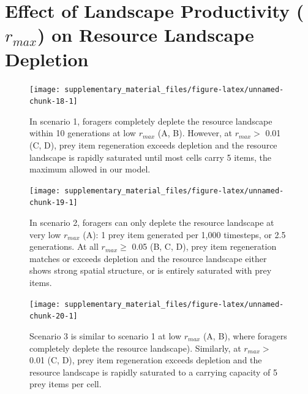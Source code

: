 \documentclass[]{article}
\begin{document}
\newpage

\hypertarget{effect-of-landscape-productivity-r_max-on-resource-landscape-depletion}{%
\section{\texorpdfstring{Effect of Landscape Productivity (\(r_{max}\)) on Resource Landscape Depletion}{Effect of Landscape Productivity (r\_\{max\}) on Resource Landscape Depletion}}\label{effect-of-landscape-productivity-r_max-on-resource-landscape-depletion}}

\begin{figure}

{\centering \texttt{[image: supplementary\_material\_files/figure-latex/unnamed-chunk-18-1]} 

}

\caption{In scenario 1, foragers completely deplete the resource landscape within 10 generations at low $r_{max}$ (A, B). However, at $r_{max} >$ 0.01 (C, D), prey item regeneration exceeds depletion and the resource landscape is rapidly saturated until most cells carry 5 items, the maximum allowed in our model.}\label{fig:unnamed-chunk-18}
\end{figure}

\begin{figure}

{\centering \texttt{[image: supplementary\_material\_files/figure-latex/unnamed-chunk-19-1]} 

}

\caption{In scenario 2, foragers can only deplete the resource landscape at very low $r_{max}$ (A): 1 prey item generated per 1,000 timesteps, or 2.5 generations. At all $r_{max} \geq$ 0.05 (B, C, D), prey item regeneration matches or exceeds depletion and the resource landscape either shows strong spatial structure, or is entirely saturated with prey items.}\label{fig:unnamed-chunk-19}
\end{figure}

\begin{figure}

{\centering \texttt{[image: supplementary\_material\_files/figure-latex/unnamed-chunk-20-1]} 

}

\caption{Scenario 3 is similar to scenario 1 at low $r_{max}$ (A, B), where foragers completely deplete the resource landscape). Similarly, at $r_{max} >$ 0.01 (C, D), prey item regeneration exceeds depletion and the resource landscape is rapidly saturated to a carrying capacity of 5 prey items per cell.}\label{fig:unnamed-chunk-20}
\end{figure}
\end{document}
